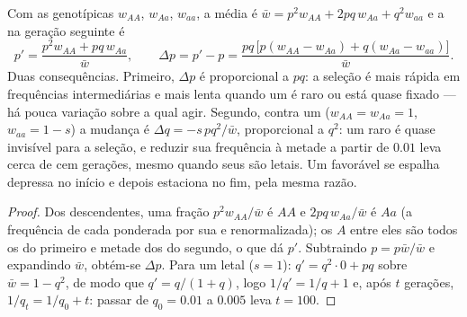 \begin{theorem}\label{thm:b2:population-genetics:selection}
Com as  genotípicas $w_{AA}$, $w_{Aa}$, $w_{aa}$, a 
média é $\bar w = p^{2}w_{AA} + 2pq\,w_{Aa} + q^{2}w_{aa}$ e a
 na geração seguinte é
\[
p' = \frac{p^{2}w_{AA} + pq\,w_{Aa}}{\bar w}, \qquad
\Delta p = p' - p = \frac{pq\,\bigl[p(w_{AA} - w_{Aa}) + q(w_{Aa} - w_{aa})\bigr]}{\bar w}.
\]
Duas consequências. Primeiro, $\Delta p$ é proporcional a $pq$: a
seleção é mais rápida em frequências intermediárias e mais lenta quando
um  é raro ou está quase fixado --- há pouca variação sobre a qual
agir. Segundo, contra um   ($w_{AA} = w_{Aa} = 1$, $w_{aa} =
1 - s$) a mudança é $\Delta q = -s\,pq^{2}/\bar w$, proporcional
a $q^{2}$: um  raro é quase invisível para a seleção, e reduzir
sua frequência à metade a partir de $0.01$ leva cerca de cem gerações,
mesmo quando seus  são letais. Um   favorável
se espalha depressa no início e depois estaciona no fim, pela mesma
razão.
\end{theorem}
\begin{proof}
Dos descendentes, uma fração $p^{2}w_{AA}/\bar w$ é $AA$ e
$2pq\,w_{Aa}/\bar w$ é $Aa$ (a frequência de cada  ponderada
por sua  e renormalizada); os  $A$ entre eles são todos os
do primeiro e metade dos do segundo, o que dá $p'$. Subtraindo $p =
p\bar w/\bar w$ e expandindo $\bar w$, obtém-se $\Delta p$. Para um
 letal ($s = 1$): $q' = q^{2}\cdot 0 + pq$ sobre $\bar w = 1 -
q^{2}$, de modo que $q' = q/(1 + q)$, logo $1/q' = 1/q + 1$ e, após $t$
gerações, $1/q_t = 1/q_0 + t$: passar de $q_0 = 0.01$ a $0.005$ leva
$t = 100$.
\end{proof}

